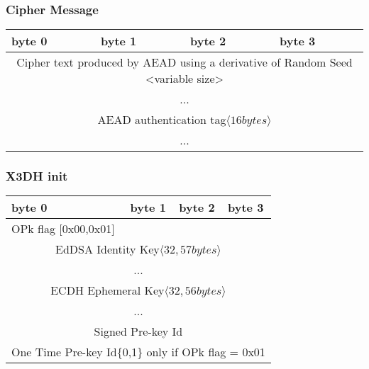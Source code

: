 \documentclass[a4paper,11pt]{article}
\begin{document}
      \subsubsection{Cipher Message}
      \begin{center}
      \begin{tabular}{ | p{1.4in} | p{1.4in} | p{1.4in} | p{1.4in} |}
        \hline
        \cellcolor[gray]{0.85} byte 0 & \cellcolor[gray]{0.85} byte 1 & \cellcolor[gray]{0.85} byte 2 & \cellcolor[gray]{0.85}byte 3\\
        \hline
        \multicolumn{4}{|c|}{Cipher text produced by AEAD using a derivative of Random Seed <variable size>}\\
        \multicolumn{4}{|c|}{...}\\
        \hline
        \multicolumn{4}{|c|}{AEAD authentication tag$\langle 16bytes\rangle $}\\
        \multicolumn{4}{|c|}{...}\\
        \hline
      \end{tabular}
      \end{center}
      
      \subsubsection{X3DH init}
      \begin{center}
      \begin{tabular}{ | p{1.4in} | p{1.4in} | p{1.4in} | p{1.4in} |}
        \hline
        \cellcolor[gray]{0.85} byte 0 & \cellcolor[gray]{0.85} byte 1 & \cellcolor[gray]{0.85} byte 2 & \cellcolor[gray]{0.85}byte 3\\
        \hline
        OPk flag [0x00,0x01]&\multicolumn{3}{|c|}{}\\
        \cline{1-1}
        \multicolumn{4}{|c|}{EdDSA Identity Key$\langle 32,57bytes\rangle $}\\
        \multicolumn{4}{|c|}{...}\\
        \hline
        \multicolumn{4}{|c|}{ ECDH Ephemeral Key$\langle 32,56bytes\rangle $}\\
        \multicolumn{4}{|c|}{...}\\
        \hline
        \multicolumn{4}{|c|}{Signed Pre-key Id}\\
        \hline
        \multicolumn{4}{|c|}{One Time Pre-key Id\{0,1\} only if OPk flag = 0x01}\\
        \hline
      \end{tabular}
      \end{center}
\end{document}

